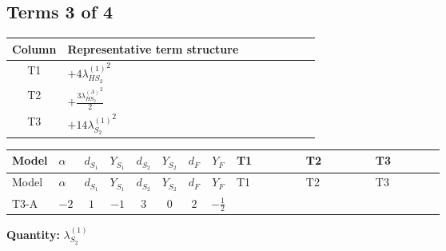 \documentclass[8pt]{article}
\begin{document}
\begin{landscape}
\subsection*{Terms 3 of 4}
\begin{center}
\begin{tabular}{@{}c >{\raggedright\arraybackslash}p{0.82\linewidth}@{}}
\toprule
Column & Representative term structure \\
\midrule
T1 & \(\displaystyle +4 {\lambda_{HS_2}^{(1)}}^2\) \\
\midrule
T2 & \(\displaystyle +\frac{3 {\lambda_{HS_2}^{(A)}}^2}{2}\) \\
\midrule
T3 & \(\displaystyle +14 {\lambda_{S_2}^{(1)}}^2\) \\
\midrule
\bottomrule
\end{tabular}
\end{center}
\smallskip
\tiny
\begin{longtable}{@{}llcccccc >{\raggedright\arraybackslash}p{0.21\linewidth} >{\raggedright\arraybackslash}p{0.21\linewidth} >{\raggedright\arraybackslash}p{0.21\linewidth}@{}}
\toprule
Model & $\alpha$ & $d_{S_1}$ & $Y_{S_1}$ & $d_{S_2}$ & $Y_{S_2}$ & $d_F$ & $Y_F$ & T1 & T2 & T3 \\
\midrule
\endfirsthead
\toprule
Model & $\alpha$ & $d_{S_1}$ & $Y_{S_1}$ & $d_{S_2}$ & $Y_{S_2}$ & $d_F$ & $Y_F$ & T1 & T2 & T3 \\
\midrule
\endhead
T3-A & $-2$ & $1$ & $-1$ & $3$ & $0$ & $2$ & $-\frac{1}{2}$ & \scriptsize\adjustbox{max width=\linewidth}{$\begin{gathered} +4 {\lambda_{HS_2}^{(1)}}^2\end{gathered}$} & \scriptsize\adjustbox{max width=\linewidth}{$\begin{gathered} +\frac{3 {\lambda_{HS_2}^{(A)}}^2}{2}\end{gathered}$} & \scriptsize\adjustbox{max width=\linewidth}{$\begin{gathered} +14 {\lambda_{S_2}^{(1)}}^2\end{gathered}$} \\
\midrule
\bottomrule
\end{longtable}
\clearpage
\noindent\textbf{Quantity: }$\lambda_{S_2}^{(1)}$\par\smallskip

\end{landscape}
\end{document}
